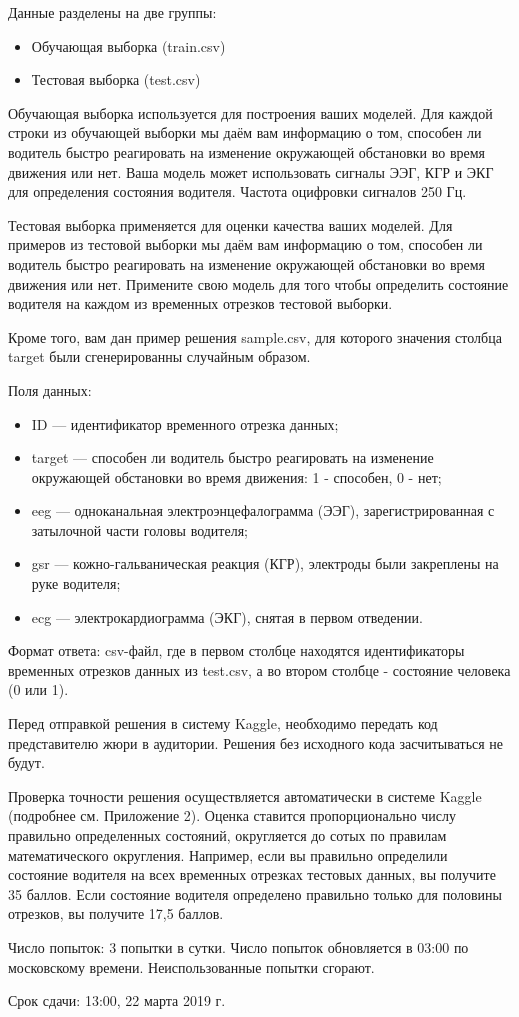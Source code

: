 Данные разделены на две группы:
\begin{itemize}
\item Обучающая выборка (train.csv)
\item Тестовая выборка (test.csv)
\end{itemize}

Обучающая выборка используется для построения ваших моделей. Для каждой строки из обучающей выборки мы даём вам информацию о том, способен ли водитель быстро  реагировать на изменение окружающей обстановки во время движения или нет. Ваша модель может использовать сигналы ЭЭГ, КГР и ЭКГ для определения состояния водителя. Частота оцифровки сигналов 250 Гц.

Тестовая выборка применяется для оценки качества ваших моделей. Для примеров из тестовой выборки мы даём вам информацию о том, способен ли водитель быстро реагировать на изменение окружающей обстановки во время движения или нет. Примените свою модель для того чтобы определить состояние водителя на каждом из временных отрезков тестовой выборки.

Кроме того, вам дан пример решения sample.csv, для которого значения столбца target были сгенерированны случайным образом.

Поля данных:
\begin{itemize}
    \item ID — идентификатор временного отрезка данных;
    \item target — способен ли водитель быстро реагировать на изменение окружающей обстановки во время движения: 1 - способен, 0 - нет;
    \item eeg — одноканальная электроэнцефалограмма (ЭЭГ), зарегистрированная с затылочной части головы водителя;
    \item gsr — кожно-гальваническая реакция (КГР), электроды были закреплены на руке водителя;
    \item ecg — электрокардиограмма (ЭКГ), снятая в первом отведении.
\end{itemize}

Формат ответа: csv-файл, где в первом столбце находятся идентификаторы временных отрезков данных из test.csv, а во втором столбце - состояние человека (0 или 1).

Перед отправкой решения в систему Kaggle, необходимо передать код представителю жюри в аудитории. Решения без исходного кода засчитываться не будут.

\markSection
Проверка точности решения осуществляется автоматически в системе Kaggle (подробнее см. Приложение 2). Оценка ставится пропорционально числу правильно определенных состояний, округляется до сотых по правилам математического округления. Например, если вы правильно определили состояние водителя на всех временных отрезках тестовых данных, вы получите 35 баллов. Если состояние водителя определено правильно только для половины отрезков, вы получите 17,5 баллов.

Число попыток: 3 попытки в сутки. Число попыток обновляется в 03:00 по московскому времени. Неиспользованные попытки сгорают.

Срок сдачи: 13:00, 22 марта 2019 г.

